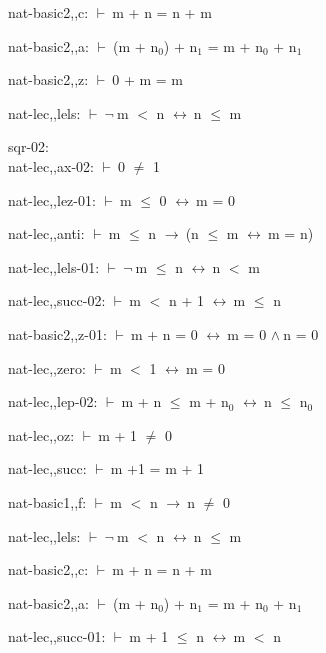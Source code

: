 \documentclass[a4paper]{article}
\newcommand{\Fol}{\mbox{$\vdash\ $}}
\newcommand{\Not}{\mbox{$\neg\ $}}
\newcommand{\And}{\mbox{$\wedge\ $}}
\newcommand{\Imp}{\mbox{$\rightarrow\ $}}
\newcommand{\Equiv}{\mbox{$\leftrightarrow\ $}}
\begin{document}
nat-basic2,,c: 
 \Fol m + n = n + m



nat-basic2,,a: 
 \Fol (m + $\mbox{n}_{0}$) + $\mbox{n}_{1}$ = m + $\mbox{n}_{0}$ + $\mbox{n}_{1}$



nat-basic2,,z: 
 \Fol 0 + m = m



nat-lec,,lels: 
 \Fol \Not m $<$ n \Equiv n $\le$ m



\bigskip

sqr-02:\\ nat-lec,,ax-02: 
 \Fol 0 $\neq$ 1



nat-lec,,lez-01: 
 \Fol m $\le$ 0 \Equiv m = 0



nat-lec,,anti: 
 \Fol m $\le$ n \Imp (n $\le$ m \Equiv m = n)



nat-lec,,lels-01: 
 \Fol \Not m $\le$ n \Equiv n $<$ m



nat-lec,,succ-02: 
 \Fol m $<$ n + 1 \Equiv m $\le$ n



nat-basic2,,z-01: 
 \Fol m + n = 0 \Equiv m = 0 \And n = 0



nat-lec,,zero: 
 \Fol m $<$ 1 \Equiv m = 0



nat-lec,,lep-02: 
 \Fol m + n $\le$ m + $\mbox{n}_{0}$ \Equiv n $\le$ $\mbox{n}_{0}$



nat-lec,,oz: 
 \Fol m + 1 $\neq$ 0



nat-lec,,succ: 
 \Fol m +1 = m + 1



nat-basic1,,f: 
 \Fol m $<$ n \Imp n $\neq$ 0



nat-lec,,lels: 
 \Fol \Not m $<$ n \Equiv n $\le$ m



nat-basic2,,c: 
 \Fol m + n = n + m



nat-basic2,,a: 
 \Fol (m + $\mbox{n}_{0}$) + $\mbox{n}_{1}$ = m + $\mbox{n}_{0}$ + $\mbox{n}_{1}$



nat-lec,,succ-01: 
 \Fol m + 1 $\le$ n \Equiv m $<$ n
\end{document}
